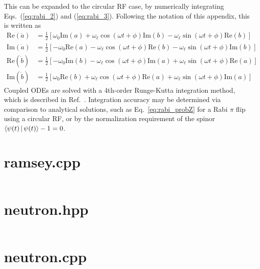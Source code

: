 %
This can be expanded to the circular RF case, by numerically integrating  Eqs.~(\ref{eq:rabi_2}) and (\ref{eq:rabi_3}). Following the notation of this appendix, this is written as
%
\begin{align}
    \text{Re}(\dot{a}) &= \frac{1}{2}\left[\omega_0\text{Im}(a) +\omega_\ell\cos(\omega t +\phi)\text{Im}(b) -\omega_\ell\sin(\omega t +\phi)\text{Re}(b) \right]\\
    \text{Im}(\dot{a}) &= \frac{1}{2}\left[-\omega_0\text{Re}(a)-\omega_\ell\cos(\omega t+\phi)\text{Re}(b) -\omega_\ell\sin(\omega t+\phi)\text{Im}(b) \right] \\
    \text{Re}(\dot{b}) &= \frac{1}{2}\left[-\omega_0\text{Im}(b)-\omega_\ell\cos(\omega t+\phi)\text{Im}(a) +\omega_\ell\sin(\omega t+\phi)\text{Re}(a) \right] \\
    \text{Im}(\dot{b}) &= \frac{1}{2}\left[\omega_0\text{Re}(b) +\omega_\ell\cos(\omega t +\phi)\text{Re}(a) +\omega_\ell\sin(\omega t+\phi)\text{Im}(a) \right]
\end{align}
%
Coupled ODEs are solved with a 4th-order Runge-Kutta integration method, which is described in Ref.~\cite{numerical_recipes}. Integration accuracy may be determined via comparison to analytical solutions, such as Eq.~\ref{eq:rabi_probZ} for a Rabi $\pi$ flip using a circular RF, or by the normalization requirement of the spinor $\Braket{\psi(t) | \psi(t)} - 1 = 0$.

\section{ramsey.cpp}

\inputminted{cpp}{code_snippets/ramsey.cpp}

\section{neutron.hpp}

\inputminted{cpp}{code_snippets/neutron.hpp}

\section{neutron.cpp}

\inputminted{cpp}{code_snippets/neutron.cpp}
